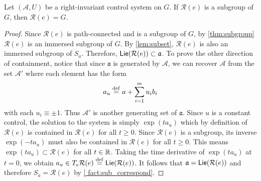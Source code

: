 \documentclass[12pt,class=article,crop=false]{standalone}
\begin{document}
\begin{theorem} \label{thm:reach_subgroup} 
Let $ (\mathcal{A},U)$ be a right-invariant control system on $G$. If $ \mathcal{R}( e) $ is a subgroup of $ G$, then  $ \mathcal{R}( e) = G$.

\end{theorem}
\begin{proof}
	Since $ \mathcal{R}( e) $ is path-connected and is a subgroup of $ G$, by \cref{thm:subgroup} $ \mathcal{R}( e) $ is an immersed subgroup of $ G$. By \cref{lem:subset}, $ \mathcal{R}( e) $ is also an immersed subgroup of $ S_a$. Therefore,  $ \mathsf{Lie}( \mathcal{R}( e) ) \subset \mathfrak{a} $. To prove the other direction of containment, notice that since $ \mathfrak{a} $ is generated by $ \mathcal{ A}$, we can recover $ \mathcal{ A}$ from the set $ \mathcal{ A}'$ where each element has the form
\begin{align*}
	a_u \stackrel{\mathrm{def}}{=} a+ \sum_{ i= 1}^{ m} u_i b_i 
\end{align*}
with each $ u_i \equiv \pm 1$. Thus $ \mathcal{ A}'$ is another generating set of $ \mathfrak{a} $. Since $ u$ is a constant control, the solution to the system is simply  $\exp(t a_u) $ which by definition of $ \mathcal{R}( e) $ is contained in $ \mathcal{R}( e) $ for all $ t \geq 0$. Since  $ \mathcal{R}( e) $ is a subgroup, its inverse $ \exp( -t a_u)$ must also be contained in $ \mathcal{R}( e) $ for all $ t \geq 0$. This means  $ \exp( ta_u) \subset \mathcal{R}( e) $ for all $ t \in \mathbb{R}$. Taking the time derivative of $ \exp( t a_u)$ at $ t=0$, we obtain  $ a_u \in T_e \mathcal{R}( e) \stackrel{\mathrm{def}}{=}  \mathsf{Lie}( \mathcal{R}( e) )$. It follows that $ \mathfrak{a} = \mathsf{Lie}( \mathcal{R}( e) )$ and therefore $ S_a = \mathcal{R}( e) $ by \cref{ fact:sub_correspond}. 
\end{proof}
\end{document}
